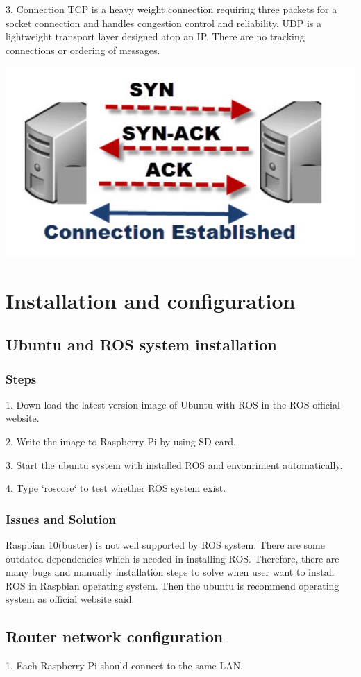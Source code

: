\documentclass{mproj}
\begin{document}
3. Connection
TCP is a heavy weight connection requiring three packets for a socket connection and handles congestion control and reliability. UDP is a lightweight transport layer designed atop an IP. There are no tracking connections or ordering of messages.

\includegraphics[width = .7\textwidth]{d.jpg}

\chapter{Installation and configuration}


\section{Ubuntu and ROS system installation}
\subsection{Steps}
1. Down load the latest version image of Ubuntu with ROS in the ROS official website.

2. Write the image to Raspberry Pi by using SD card.

3. Start the ubuntu system with installed ROS and envonriment automatically. 

4. Type `roscore` to test whether ROS system exist.
\subsection{Issues and Solution}
Raspbian 10(buster) is not well supported by ROS system. There are some outdated dependencies which is needed in installing ROS. Therefore, there are many bugs and manually installation steps to solve when user want to install ROS in Raspbian operating system. Then the ubuntu is recommend operating system as official website said.


\section{Router network configuration}
1. Each Raspberry Pi should connect to the same LAN.
\end{document}
